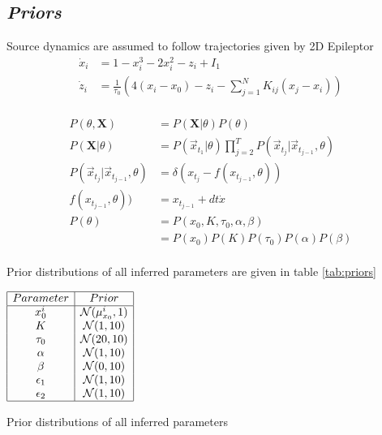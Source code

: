 \documentclass[12pt]{article}
\begin{document}
\subsection*{\textit{Priors}}
Source dynamics are assumed to follow trajectories given by 2D Epileptor
\begin{align*}
  \dot x_i &= 1 - x_i^3 - 2 x_i^2 - z_i + I_1\\
  \dot z_i & = \frac{1}{\tau_0} \left( 4(x_i - x_0) - z_i - \sum_{j=1}^{N}K_{ij}(x_j - x_i)\right) \\
\end{align*}

\begin{align*}
  P(\theta, \textbf{X}) & = P(\textbf{X} | \theta) P(\theta) \\
  P(\textbf{X} | \theta) & = P(\vec x_{t_1} | \theta)\prod_{j=2}^{T}P(\vec x_{t_j} | \vec x_{t_{j-1}}, \theta) \\
  P(\vec x_{t_j} | \vec x_{t_{j-1}}, \theta) & = \delta(x_{t_j} - f(x_{t_{j-1}}, \theta)) \\
  f(x_{t_{j-1}}, \theta)) & = x_{t_{j-1}} + dt \dot x \\
  P(\theta) & = P(x_0, K, \tau_0, \alpha, \beta) \\
                        & = P(x_0)P(K)P(\tau_0)P(\alpha)P(\beta)\\
\end{align*}

Prior distributions of all inferred parameters are given in table \ref{tab:priors}

\begin{table}
  \centering
  $\begin{array}{|c|c|}
     \hline
     Parameter & Prior \\
     \hline
     x_0^i & \mathcal{N}(\mu_{x_0}^i, 1) \\
     K & \mathcal{N}(1, 10) \\
     \tau_0 & \mathcal{N}(20, 10) \\
     \alpha & \mathcal{N}(1, 10) \\
     \beta & \mathcal{N}(0, 10) \\
     \epsilon_1 & \mathcal{N}(1, 10) \\
     \epsilon_2 & \mathcal{N}(1, 10) \\
     \hline
   \end{array}$  
   \caption{Prior distributions of all inferred parameters}
   \label{tab:priors}
 \end{table}
\end{document}
